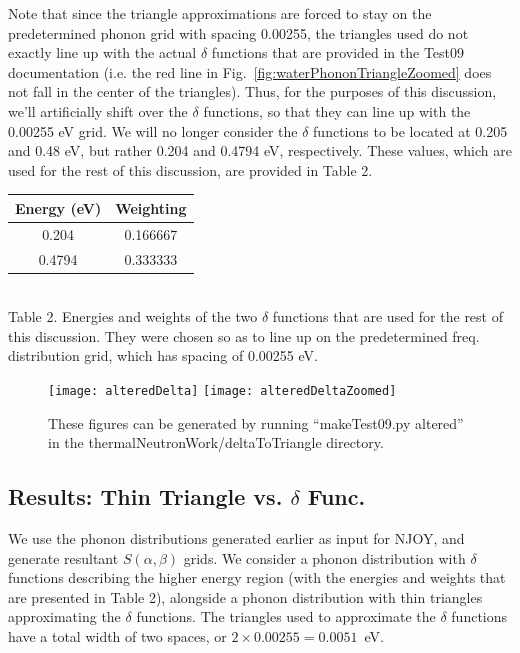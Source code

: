 \documentclass[10pt]{article}
\begin{document}
  
  Note that since the triangle approximations are forced to stay on the predetermined phonon grid with spacing 0.00255, the triangles used do not exactly line up with the actual $\delta$ functions that are provided in the Test09 documentation (i.e. the red line in Fig.~\ref{fig:waterPhononTriangleZoomed} does not fall in the center of the triangles). Thus, for the purposes of this discussion, we'll artificially shift over the $\delta$ functions, so that they can line up with the 0.00255 eV grid. We will no longer consider the $\delta$ functions to be located at 0.205 and 0.48 eV, but rather 0.204 and 0.4794 eV, respectively. These values, which are used for the rest of this discussion, are provided in Table 2.

\begin{center}
\begin{tabular}{ |c|c| }\hline
 Energy (eV)& Weighting\\\hline
 0.204& 0.166667\\\hline
 0.4794 & 0.333333 \\\hline
\end{tabular}\\[1ex]
Table 2. Energies and weights of the two $\delta$ functions that are used for the rest of this discussion. They were chosen so as to line up on the predetermined freq. distribution grid, which has spacing of 0.00255 eV.
\end{center}


            \begin{figure}[H]
              \begin{center}
              \texttt{[image: alteredDelta]}
              \texttt{[image: alteredDeltaZoomed]}
                \caption{These figures can be generated by running ``makeTest09.py altered'' in the thermalNeutronWork/deltaToTriangle directory.}
              \label{fig:alteredDelta}
              \end{center}
            \end{figure}



 

\subsection*{Results: Thin Triangle vs. $\delta$ Func.}
We use the phonon distributions generated earlier as input for NJOY, and generate resultant $S(\alpha,\beta)$ grids. We consider a phonon distribution with $\delta$ functions describing the higher energy region (with the energies and weights that are presented in Table 2), alongside a phonon distribution with thin triangles approximating the $\delta$ functions. The triangles used to approximate the $\delta$ functions have a total width of two spaces, or $2\times0.00255=0.0051$~eV.
\end{document}
